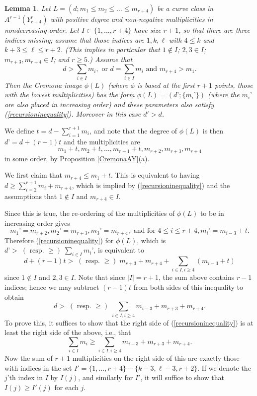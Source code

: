 \documentclass[12pt]{article}
\newtheorem{lemma}[equation]{Lemma}
\numberwithin{equation}{section}
\numberwithin{subeq}{equation}
\begin{document}

\begin{lemma}\label{recursionCremona} %
Let $L = (d;m_1 \leq m_2 \leq \ldots \leq m_{r+4})$
be a curve class in $A^{r-1}(Y^r_{r+4})$
with positive degree and non-negative multiplicities in nondecreasing order.
Let $I \subset \{1,\ldots,r+4\}$ have size $r+1$, so that there are three indices missing;
assume that those indices are $1, k, \ell$ with $4 \leq k$ and $k+3 \leq \ell \leq r+2$.
(This implies in particular that $1 \notin I$; $2, 3 \in I$;
$m_{r+3}, m_{r+4} \in I$; and $r \geq 5$.)
Assume that
\begin{equation}\label{recursioninequality}
d > \sum_{i \in I} m_i, 
\text{ or } d = \sum_{i \in I} m_i \text{ and } m_{r+4} > m_1.
\end{equation}
Then the Cremona image $\phi(L)$
(where $\phi$ is based at the first $r+1$ points, those with the lowest multiplicities)
has the form $\phi(L) = (d’; \{m_i’\})$
(where the $m_i’$ are also placed in increasing order)
and these parameters also satisfy (\ref{recursioninequality}).
Moreover in this case $d' > d$.
\end{lemma}

\medskip{}
We define $t = d-\sum_{i=1}^{r+1}m_i$,
and note that the degree of $\phi(L)$ is then $d’ = d+(r-1)t$
and the multiplicities are 
\[
m_1+t, m_2+t,\ldots,m_{r+1}+t, m_{r+2}, m_{r+3}, m_{r+4}
\]
in some order, by Proposition \ref{CremonaAY}(a).

We first claim that $m_{r+4} \leq m_1+t$.
This is equivalent to having $d \geq \sum_{i=2}^{r+1}m_i + m_{r+4}$,
which is implied by (\ref{recursioninequality}) and the assumptions that $1 \notin I$
and $m_{r+4} \in I$.

Since this is true, the re-ordering of the multiplicities of $\phi(L)$
to be in increasing order gives
\[
m_1’ = m_{r+2}, m_2’ = m_{r+3}, m_3’ = m_{r+4},
\text{ and for } 4 \leq i \leq r+4, m_i’ = m_{i-3}+t.
\]
Therefore (\ref{recursioninequality}) for $\phi(L)$, which is 
$d’ > \;(\text{ resp. }\geq)\;\sum_{i\in I} m_i’$,
is equivalent to
\[
d+(r-1)t > \;(\text{ resp. }\geq)\; m_{r+3} + m_{r+4} + \sum_{i \in I, i \geq 4} (m_{i-3}+t)
\]
since $1 \notin I$ and $2,3 \in I$.
Note that since $|I|=r+1$, the sum above contains $r-1$ indices;
hence we may subtract $(r-1)t$ from both sides of this inequality to obtain
\[
d > \;(\text{ resp. }\geq)\; \sum_{i \in I, i \geq 4} m_{i-3} + m_{r+3} + m_{r+4}.
\]
To prove this, it suffices to show that the right side of (\ref{recursioninequality})
is at least the right side of the above, i.e., that
\[
\sum_{i \in I} m_i \geq \sum_{i \in I, i \geq 4} m_{i-3} + m_{r+3} + m_{r+4}.
\]
Now the sum of $r+1$ multiplicities on the right side of this
are exactly those with indices in the set $I' = \{1,\ldots,r+4\} - \{k-3, \ell-3, r+2\}$.
If we denote the $j$'th index in $I$ by $I(j)$, and similarly for $I'$,
it will suffice to show that $I(j) \geq I'(j)$ for each $j$.
\end{document}
